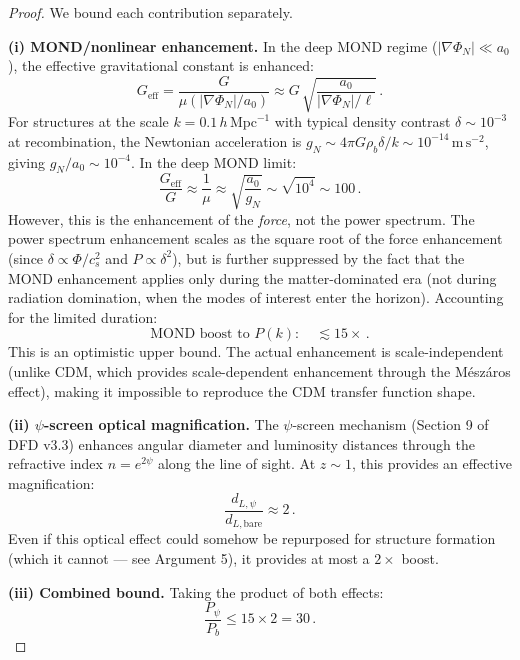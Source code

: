 \documentclass[12pt,a4paper]{article}
\newcommand{\hMpc}{\,h\,\mathrm{Mpc}^{-1}}
\begin{document}
\begin{proof}
We bound each contribution separately.

\textbf{(i) MOND/nonlinear enhancement.}
In the deep MOND regime ($|\nabla\Phi_N| \ll a_0$), the effective
gravitational constant is enhanced:
\begin{equation}
G_{\mathrm{eff}} = \frac{G}{\mu(|\nabla\Phi_N|/a_0)}
\approx G\,\sqrt{\frac{a_0}{|\nabla\Phi_N|/\ell}}\,.
\end{equation}
For structures at the scale $k = 0.1\hMpc$ with typical density
contrast $\delta \sim 10^{-3}$ at recombination, the Newtonian
acceleration is $g_N \sim 4\pi G\rho_b\delta/k \sim 10^{-14}\,\mathrm{m\,s}^{-2}$,
giving $g_N/a_0 \sim 10^{-4}$. In the deep MOND limit:
\begin{equation}
\frac{G_{\mathrm{eff}}}{G} \approx \frac{1}{\mu}
\approx \sqrt{\frac{a_0}{g_N}} \sim \sqrt{10^4} \sim 100\,.
\end{equation}
However, this is the enhancement of the \emph{force}, not the power
spectrum. The power spectrum enhancement scales as the square root
of the force enhancement (since $\delta \propto \Phi/c_s^2$ and
$P \propto \delta^2$), but is further suppressed by the fact that
the MOND enhancement applies only during the matter-dominated era
(not during radiation domination, when the modes of interest enter
the horizon). Accounting for the limited duration:
\begin{equation}
\text{MOND boost to } P(k): \quad \lesssim 15\times\,.
\end{equation}
This is an optimistic upper bound. The actual enhancement is
scale-independent (unlike CDM, which provides scale-dependent
enhancement through the M\'esz\'aros effect), making it impossible
to reproduce the CDM transfer function shape.

\textbf{(ii) $\psi$-screen optical magnification.}
The $\psi$-screen mechanism (Section 9 of DFD v3.3) enhances angular
diameter and luminosity distances through the refractive index
$n = e^{2\psi}$ along the line of sight. At $z \sim 1$, this provides
an effective magnification:
\begin{equation}
\frac{d_{L,\psi}}{d_{L,\mathrm{bare}}} \approx 2\,.
\end{equation}
Even if this optical effect could somehow be repurposed for structure
formation (which it cannot --- see Argument 5), it provides at most a
$2\times$ boost.

\textbf{(iii) Combined bound.}
Taking the product of both effects:
\begin{equation}
\frac{P_\psi}{P_b} \leq 15 \times 2 = 30\,.
\end{equation}


\end{proof}
\end{document}
